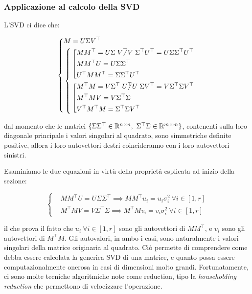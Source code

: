 \subsubsection{Applicazione al calcolo della SVD}

L'SVD ci dice che:

\[
	\left\{
	\begin{aligned}
	&M=U\Sigma V^\top\\
	&\left\{
	\begin{aligned}
	&\left[
	\begin{aligned}
	&MM^\top = U\Sigma\centernot{V^\top V}\Sigma^\top U^\top = U\Sigma\Sigma^\top U^\top\\
	&MM^\top U = U\Sigma\Sigma^\top\\
	&U^\top MM^\top = \Sigma\Sigma^\top U^\top
	\end{aligned}
	\right.\\
	&\left[
	\begin{aligned}
	&M^\top M = V\Sigma^\top \centernot{U^\top U}\Sigma V^\top = V\Sigma^\top\Sigma V^\top\\
	&M^\top MV = V\Sigma^\top\Sigma\\
	&V^\top M^\top M = \Sigma^\top\Sigma V^\top
	\end{aligned}
	\right.
	\end{aligned}
	\right.
	\end{aligned}
	\right.
\]

dal momento che le matrici $\{\Sigma\Sigma^\top\in\R^{n\times n},\ \Sigma^\top\Sigma\in\R^{m\times m}\}$, contenenti sulla loro diagonale principale i valori singolari al quadrato, sono simmetriche definite positive, allora i loro autovettori destri coincideranno con i loro autovettori sinistri.

Esaminiamo le due equazioni in virtù della proprietà esplicata ad inizio della sezione:

\[
	\left\{
	\begin{aligned}
	&MM^\top U = U\Sigma\Sigma^\top \implies MM^\top u_i = u_i\sigma_i^2\ \forall i\in[1,r]\\
	&M^\top M V = V\Sigma^\top\Sigma \implies M^\top M v_i = v_i\sigma_i^2\ \forall i\in[1,r]
	\end{aligned}
	\right.
\]

il che prova il fatto che $u_i\ \forall i\in[1,r]$ sono gli autovettori di $MM^\top$, e $v_i$ sono gli autovettori di $M^\top M$. Gli autovalori, in ambo i casi, sono naturalmente i valori singolari della matrice originaria al quadrato. Ciò permette di comprendere come debba essere calcolata la generica SVD di una matrice, e quanto possa essere computazionalmente onerosa in casi di dimensioni molto grandi. Fortunatamente, ci sono molte tecniche algoritmiche note come reduction, tipo la \textit{householding reduction} che permettono di velocizzare l'operazione.